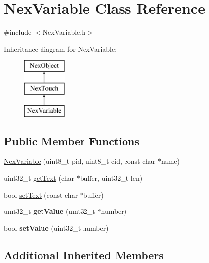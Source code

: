 \hypertarget{class_nex_variable}{\section{Nex\+Variable Class Reference}
\label{class_nex_variable}
}


{\ttfamily \#include $<$Nex\+Variable.\+h$>$}

Inheritance diagram for Nex\+Variable\+:\begin{figure}[H]
\begin{center}
\leavevmode
\includegraphics[height=3.000000cm]{class_nex_variable}
\end{center}
\end{figure}
\subsection*{Public Member Functions}
\begin{DoxyCompactItemize}
\item 
\hyperlink{class_nex_variable_a7d36d19e14c991872fb1547f3ced09b2}{Nex\+Variable} (uint8\+\_\+t pid, uint8\+\_\+t cid, const char $\ast$name)
\item 
uint32\+\_\+t \hyperlink{class_nex_variable_ab4d12f14dcff3f6930a2bdf5e1f3d259}{get\+Text} (char $\ast$buffer, uint32\+\_\+t len)
\item 
bool \hyperlink{class_nex_variable_aab59ac44eb0804664a03c09932be70eb}{set\+Text} (const char $\ast$buffer)
\item 
\hypertarget{class_nex_variable_aff06d16d022876c749d3e30f020b1557}{uint32\+\_\+t {\bfseries get\+Value} (uint32\+\_\+t $\ast$number)}\label{class_nex_variable_aff06d16d022876c749d3e30f020b1557}

\item 
\hypertarget{class_nex_variable_a9da9d4a74f09e1787e4e4562da1e4833}{bool {\bfseries set\+Value} (uint32\+\_\+t number)}\label{class_nex_variable_a9da9d4a74f09e1787e4e4562da1e4833}

\end{DoxyCompactItemize}
\subsection*{Additional Inherited Members}


